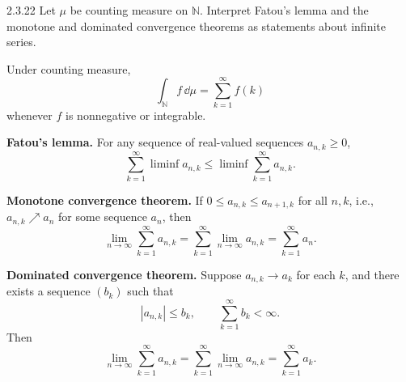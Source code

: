 \documentclass[11pt]{article}
\begin{document}
\begin{problem}{2.3.22}
  Let \( \mu \) be counting measure on \( \mathbb{N} \). Interpret Fatou's lemma and the monotone and dominated convergence theorems as statements about infinite series.

  \begin{answer}
    Under counting measure,
    \begin{equation}
      \label{eq:p2-counting}
      \int_{\mathbb{N}}f\,\dd{\mu}
      =\sum_{k=1}^{\infty}f(k)
    \end{equation}
    whenever \( f \) is nonnegative or integrable.

    \textbf{Fatou's lemma.}
    For any sequence of real-valued sequences \( a_{n,k}\geq 0 \),
    \begin{equation}
      \label{eq:p2-fatou}
      \sum_{k=1}^{\infty}\liminf a_{n,k}
      \leq
      \liminf\sum_{k=1}^{\infty}a_{n,k}.
    \end{equation}

    \textbf{Monotone convergence theorem.}
    If \( 0\leq a_{n,k}\leq a_{n+1,k} \) for all \( n,k \), i.e., \( a_{n,k} \nearrow a_{n} \) for some sequence \( a_n \), then
    \begin{equation}
      \label{eq:p2-mct}
      \lim_{n\to\infty}\sum_{k=1}^{\infty}a_{n,k}
      =
      \sum_{k=1}^{\infty}\lim_{n\to\infty}a_{n,k}
      = \sum\limits_{k=1}^{\infty} a_{n}.
    \end{equation}

    \textbf{Dominated convergence theorem.}
    Suppose \( a_{n,k}\to a_k \) for each \( k \), and there exists a sequence \( (b_k) \) such that
    \begin{equation}
      \label{eq:p2-dct-hyp}
      |a_{n,k}|\leq b_k,
      \qquad
      \sum_{k=1}^{\infty}b_k<\infty.
    \end{equation}
    Then
    \begin{equation}
      \label{eq:p2-dct}
      \lim_{n\to\infty}\sum_{k=1}^{\infty}a_{n,k}
      =
      \sum\limits_{k=1}^{\infty} \lim_{n\rightarrow \infty} a_{n,k}
      =
      \sum_{k=1}^{\infty}a_k.
    \end{equation}
  \end{answer}
\end{problem}
\end{document}
